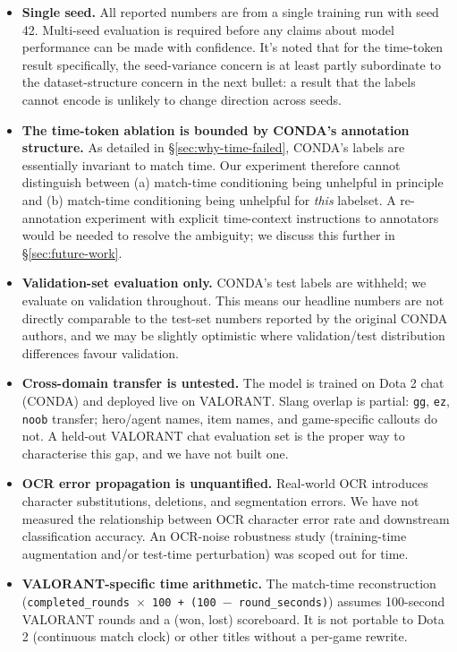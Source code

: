 \documentclass[a4paper,10.5pt,twoside]{article}
\begin{document}
\begin{itemize}
    \item \textbf{Single seed.} All reported numbers are from a single training run with seed 42. Multi-seed evaluation is required before any claims about model performance can be made with confidence. It's noted that for the time-token result specifically, the seed-variance concern is at least partly subordinate to the dataset-structure concern in the next bullet: a result that the labels cannot encode is unlikely to change direction across seeds.

    \item \textbf{The time-token ablation is bounded by CONDA's annotation structure.} As detailed in \S\ref{sec:why-time-failed}, CONDA's labels are essentially invariant to match time. Our experiment therefore cannot distinguish between (a) match-time conditioning being unhelpful in principle and (b) match-time conditioning being unhelpful for \emph{this} labelset. A re-annotation experiment with explicit time-context instructions to annotators would be needed to resolve the ambiguity; we discuss this further in \S\ref{sec:future-work}.

    \item \textbf{Validation-set evaluation only.} CONDA's test labels are withheld; we evaluate on validation throughout. This means our headline numbers are not directly comparable to the test-set numbers reported by the original CONDA authors, and we may be slightly optimistic where validation/test distribution differences favour validation.

    \item \textbf{Cross-domain transfer is untested.} The model is trained on Dota 2 chat (CONDA) and deployed live on VALORANT. Slang overlap is partial: \texttt{gg}, \texttt{ez}, \texttt{noob} transfer; hero/agent names, item names, and game-specific callouts do not. A held-out VALORANT chat evaluation set is the proper way to characterise this gap, and we have not built one.

    \item \textbf{OCR error propagation is unquantified.} Real-world OCR introduces character substitutions, deletions, and segmentation errors. We have not measured the relationship between OCR character error rate and downstream classification accuracy. An OCR-noise robustness study (training-time augmentation and/or test-time perturbation) was scoped out for time.

    \item \textbf{VALORANT-specific time arithmetic.} The match-time reconstruction (\texttt{completed\_rounds $\times$ 100 + (100 $-$ round\_seconds)}) assumes 100-second VALORANT rounds and a (won, lost) scoreboard. It is not portable to Dota 2 (continuous match clock) or other titles without a per-game rewrite.


\end{itemize}
\end{document}

